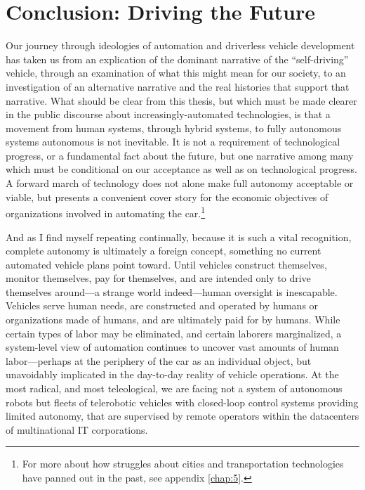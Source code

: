\chapter{Conclusion: Driving the Future}
\label{chap:4}


Our journey through ideologies of automation and driverless vehicle
development has taken us from an explication of the dominant narrative
of the ``self-driving'' vehicle, through an examination of what this
might mean for our society, to an investigation of an alternative
narrative and the real histories that support that narrative. What
should be clear from this thesis, but which must be made clearer in the
public discourse about increasingly-automated technologies, is that a
movement from human systems, through hybrid systems, to fully
autonomous systems autonomous is not inevitable. It is not a
requirement of technological progress, or a fundamental fact about the
future, but one narrative among many which must be conditional on our
acceptance as well as on technological progress. A forward march of
technology does not alone make full autonomy acceptable or viable,
but presents a convenient cover story for the economic objectives of
organizations involved in automating the car.\footnote{For more about
  how struggles about cities and transportation technologies have
  panned out in the past, see appendix \ref{chap:5}.}

And as I find myself repeating continually, because it is such a vital
recognition, complete autonomy is ultimately a foreign concept,
something no current automated vehicle plans point toward. Until
vehicles construct themselves, monitor themselves, pay for themselves,
and are intended only to drive themselves around---a strange world
indeed---human oversight is inescapable. Vehicles serve human needs,
are constructed and operated by humans or organizations made of
humans, and are ultimately paid for by humans. While certain types of
labor may be eliminated, and certain laborers marginalized, a
system-level view of automation continues to uncover vast amounts of
human labor---perhaps at the periphery of the car as an individual
object, but unavoidably implicated in the day-to-day reality of
vehicle operations. At the most radical, and most teleological, we are
facing not a system of autonomous robots but fleets of telerobotic
vehicles with closed-loop control systems providing limited autonomy,
that are supervised by remote operators within the datacenters of
multinational IT corporations. 

